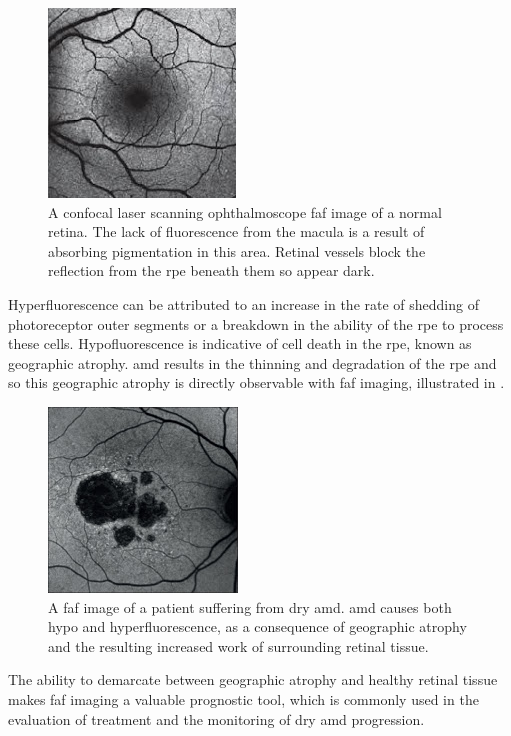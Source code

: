 \begin{figure}[H]
\centering
\includegraphics{figures/faf}
\caption{A confocal \gls{laser} scanning ophthalmoscope \gls{faf} image of a normal retina. The lack of fluorescence from the macula is a result of absorbing pigmentation in this area. Retinal vessels block the reflection from the \Gls{rpe} beneath them so appear dark.\cite{1_optos.com_2015}}
\label{fig:faf}
   \end{figure}

Hyperfluorescence can be attributed to an increase in the rate
of shedding of photoreceptor outer segments or a breakdown in
the ability of the \Gls{rpe} to process these cells. Hypofluorescence
is indicative of cell death in the \Gls{rpe}, known as geographic atrophy.
\Gls{amd} results in the thinning and degradation of the \Gls{rpe} and 
so this geographic atrophy is directly observable with \gls{faf} imaging,
illustrated in .

\begin{figure}[H]
\centering
\includegraphics{figures/fafamd}
\caption{A \gls{faf} image of a patient suffering from dry \gls{amd}. \gls{amd} causes both hypo and hyperfluorescence, as a consequence of geographic atrophy and the resulting increased work of surrounding retinal tissue.\cite{2_audo_2015}}
\label{fig:fafamd}
   \end{figure}

The ability to demarcate between geographic atrophy and healthy retinal tissue makes \gls{faf} imaging a valuable prognostic tool, which is commonly used in the evaluation of treatment and the monitoring of dry \gls{amd} progression.\cite{1_murphy_2015}

